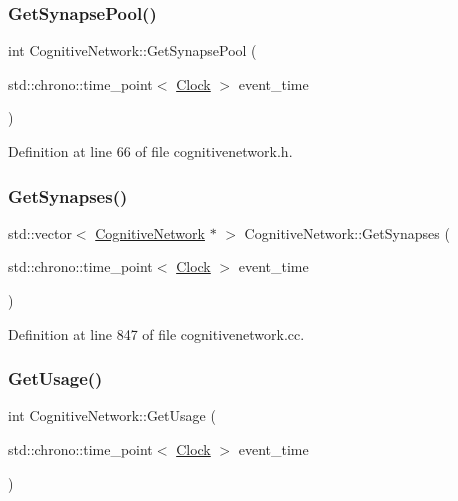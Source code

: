 \subsubsection{\texorpdfstring{Get\+Synapse\+Pool()}{GetSynapsePool()}}
{\footnotesize\ttfamily int Cognitive\+Network\+::\+Get\+Synapse\+Pool (\begin{DoxyParamCaption}\item[{std\+::chrono\+::time\+\_\+point$<$ \mbox{\hyperlink{universe_8h_a0ef8d951d1ca5ab3cfaf7ab4c7a6fd80}{Clock}} $>$}]{event\+\_\+time }\end{DoxyParamCaption})\hspace{0.3cm}{\ttfamily [inline]}}



Definition at line 66 of file cognitivenetwork.\+h.

\mbox{\label{class_cognitive_network_aa3376f2e7aed9639c2b5ba27aa6fb314}} 
\subsubsection{\texorpdfstring{Get\+Synapses()}{GetSynapses()}}
{\footnotesize\ttfamily std\+::vector$<$ \mbox{\hyperlink{class_cognitive_network}{Cognitive\+Network}} $\ast$ $>$ Cognitive\+Network\+::\+Get\+Synapses (\begin{DoxyParamCaption}\item[{std\+::chrono\+::time\+\_\+point$<$ \mbox{\hyperlink{universe_8h_a0ef8d951d1ca5ab3cfaf7ab4c7a6fd80}{Clock}} $>$}]{event\+\_\+time }\end{DoxyParamCaption})}



Definition at line 847 of file cognitivenetwork.\+cc.

\mbox{\label{class_cognitive_network_ad293916cfa0e454ef40d7e228d0dcba3}} 
\subsubsection{\texorpdfstring{Get\+Usage()}{GetUsage()}}
{\footnotesize\ttfamily int Cognitive\+Network\+::\+Get\+Usage (\begin{DoxyParamCaption}\item[{std\+::chrono\+::time\+\_\+point$<$ \mbox{\hyperlink{universe_8h_a0ef8d951d1ca5ab3cfaf7ab4c7a6fd80}{Clock}} $>$}]{event\+\_\+time }\end{DoxyParamCaption})\hspace{0.3cm}{\ttfamily [inline]}}



